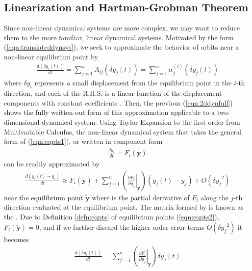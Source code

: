 \subsection{Linearization and Hartman-Grobman Theorem}
\label{subsection:HGthm}

Since non-linear dynamical systems are more complex, we may want to reduce them to the more familiar, linear dynamical systems. Motivated by the form (\ref{eqn:translateddynsys}), we seek to approximate the behavior of orbits near a non-linear equilibrium point by
\begin{align}
\frac{d(\delta y_i(t))}{dt} = \sum_{j=1}^{n} A_{ij}(\delta y_j (t)) = \sum_{j=1}^{n} \alpha_{j}^{(i)}(\delta y_j(t)) \label{eqn:dynapproxproto}
\end{align}
where $\delta y_i$ represents a small displacement from the equilibrium point in the $i$-th direction, and each of the R.H.S. is a linear function of the displacement components with constant coefficients . Then, the previous (\ref{eqn:2ddynfull}) shows the fully written-out form of this approximation applicable to a two-dimensional dynamical system. Using Taylor Expansion to the first order from Multivariable Calculus, the non-linear dynamical system that takes the general form of (\ref{eqn:eqpts1}), or written in component form
\begin{align}
\frac{d y_i}{dt} = F_i(\textbf{y})
\end{align}
can be readily approximated by
\begin{align}
\frac{d(y_i(t) - \tilde{y}_i)}{dt} \approx F_i(\tilde{\textbf{y}}) + \sum_{j=1}^{n} \left(\left.\frac{\partial F_i}{\partial y_j}\right|_{\tilde{\textbf{y}}}\right) (y_j(t) - \tilde{y}_j) + O({\delta y_j}^2)
\end{align}
near the equilibrium point $\tilde{\textbf{y}}$ where  is the partial derivative of $F_i$ along the $j$-th direction evaluated at the equilibrium point. The matrix formed by  is known as the . Due to Definition \ref{defn:eqpts} of equilibrium points (\ref{eqn:eqpts2}), $F_i(\tilde{\textbf{y}}) = 0$, and if we further discard the higher-order error terms $O({\delta y_j}^2)$ it becomes
\begin{align}
\frac{d(\delta y_i(t))}{dt} = \sum_{j=1}^{n}  \left(\left.\frac{\partial F_i}{\partial y_j}\right|_{\tilde{\textbf{y}}}\right) \delta y_j(t) \label{eqn:nonlindynjac}
\end{align}
